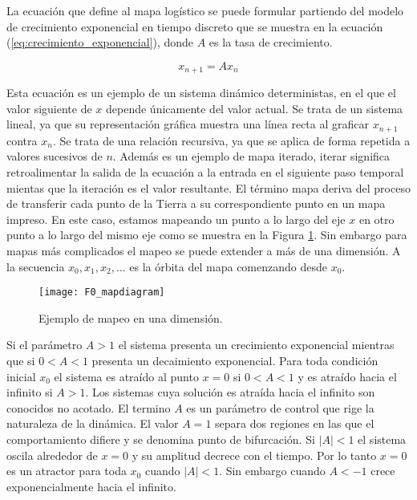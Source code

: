         La ecuación que define al mapa logístico se puede formular partiendo del modelo de crecimiento exponencial en tiempo discreto que se muestra en la ecuación (\ref{eq:crecimiento_exponencial}), donde $A$ es la tasa de crecimiento.

        \begin{equation}
            x_{n+1} = A x_{n}
            \label{eq:crecimiento_exponencial}
        \end{equation}

        Esta ecuación es un ejemplo de un sistema dinámico deterministas, en el que el valor siguiente de $x$ depende únicamente del valor actual. Se trata de un sistema lineal, ya que su representación gráfica muestra una línea recta al graficar $x_{n+1}$ contra $x_{n}$. Se trata de una relación recursiva, ya que se aplica de forma repetida a valores sucesivos de $n$. Además es un ejemplo de mapa iterado, iterar significa retroalimentar la salida de la ecuación a la entrada en el siguiente paso temporal mientas que la iteración es el valor resultante. El término mapa deriva del proceso de transferir cada punto de la Tierra a su correspondiente punto en un mapa impreso. En este caso, estamos mapeando un punto a lo largo del eje $x$ en otro punto a lo largo del mismo eje como se muestra en la Figura \ref{fig:F0_mapdiagram}. Sin embargo para mapas más complicados el mapeo se puede extender a más de una dimensión. A la secuencia $x_{0}, x_{1}, x_{2} , \ldots $ es la órbita del mapa comenzando desde $x_{0}$.

        \begin{figure}[hbtp]
            \caption{Ejemplo de mapeo en una dimensión.}
            \centering
            \texttt{[image: F0\_mapdiagram]}
            \label{fig:F0_mapdiagram}
        \end{figure}

        Si el parámetro $A > 1$ el sistema presenta un crecimiento exponencial mientras que si $0 < A < 1$ presenta un decaimiento exponencial. Para toda condición inicial $x_{0}$ el sistema es atraído al punto $x = 0$ si $0 < A < 1$ y es atraído hacia el infinito si $A > 1$. Los sistemas cuya solución es atraída hacia el infinito son conocidos no acotado. El termino $A$ es un parámetro de control que rige la naturaleza de la dinámica. El valor $A = 1$ separa dos regiones en las que el comportamiento difiere y se denomina punto de bifurcación. Si $|A| < 1$ el sistema oscila alrededor de $x = 0$ y su amplitud decrece con el tiempo. Por lo tanto $x = 0$ es un atractor para toda $x_{0}$ cuando $|A| < 1$. Sin embargo cuando $A< -1$ crece exponencialmente hacia el infinito.

